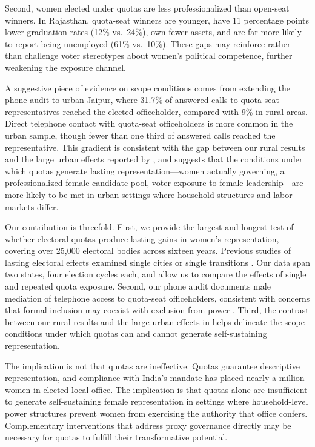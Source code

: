 \documentclass[12pt]{article}
\begin{document}
Second, women elected under quotas are less professionalized than open-seat winners. In Rajasthan, quota-seat winners are younger, have 11 percentage points lower graduation rates (12\% vs.\ 24\%), own fewer assets, and are far more likely to report being unemployed (61\% vs.\ 10\%). These gaps may reinforce rather than challenge voter stereotypes about women's political competence, further weakening the exposure channel.

A suggestive piece of evidence on scope conditions comes from extending the phone audit to urban Jaipur, where 31.7\% of answered calls to quota-seat representatives reached the elected officeholder, compared with 9\% in rural areas. Direct telephone contact with quota-seat officeholders is more common in the urban sample, though fewer than one third of answered calls reached the representative. This gradient is consistent with the gap between our rural results and the large urban effects reported by \citet{bhavnani2009electoral}, and suggests that the conditions under which quotas generate lasting representation---women actually governing, a professionalized female candidate pool, voter exposure to female leadership---are more likely to be met in urban settings where household structures and labor markets differ.

Our contribution is threefold. First, we provide the largest and longest test of whether electoral quotas produce lasting gains in women's representation, covering over 25,000 electoral bodies across sixteen years. Previous studies of lasting electoral effects examined single cities or single transitions \citep{bhavnani2009electoral, clayton2018women}. Our data span two states, four election cycles each, and allow us to compare the effects of single and repeated quota exposure. Second, our phone audit documents male mediation of telephone access to quota-seat officeholders, consistent with concerns that formal inclusion may coexist with exclusion from power \citep{valdini2019inclusion, brule2023actually, meguid2025strategic}. Third, the contrast between our rural results and the large urban effects in \citet{bhavnani2009electoral} helps delineate the scope conditions under which quotas can and cannot generate self-sustaining representation.

The implication is not that quotas are ineffective. Quotas guarantee descriptive representation, and compliance with India's mandate has placed nearly a million women in elected local office. The implication is that quotas alone are insufficient to generate self-sustaining female representation in settings where household-level power structures prevent women from exercising the authority that office confers. Complementary interventions that address proxy governance directly may be necessary for quotas to fulfill their transformative potential.
\end{document}
